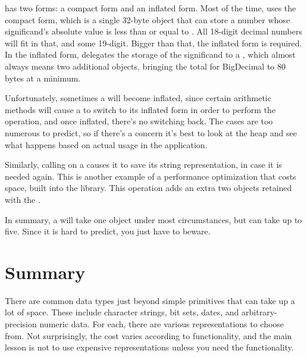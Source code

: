  has two forms: a compact form and an
inflated form. Most of the time,  uses the compact form,
which is a single 32-byte object that can store a number whose significand's
absolute value is less than or equal to .
All 18-digit decimal numbers will fit in that, and some 19-digit.  Bigger than
that, the inflated form is required. In the inflated form, 
delegates the storage of the significand to a , which almost always means two additional
objects, bringing the total for BigDecimal to 80 bytes at a
minimum.  

Unfortunately, sometimes a  will become inflated,
since certain arithmetic methods will cause a  to switch to its inflated form in order to perform the operation, and once inflated,
there's no switching back.  The cases are too numerous to predict, so if there's
a concern it's best to look at the heap and see what happens based on actual usage in the 
application.

Similarly, calling  on a  causes it to
save its string representation, in case it is needed again.
This is another example of a performance optimization that 
costs space, built into the library.  This operation adds an extra two objects
retained with the . 

In summary, a  will take one
object under most circumstances, but can take up to five. Since it is hard to
predict, you just have to beware.

\section{Summary} 

There are common data types just beyond simple primitives that can
take up a lot of space.  These include character strings, bit sets, dates, and
arbitrary-precision numeric data. For each, there are various
representations to choose from. Not surprisingly, the cost varies according to
functionality, and the main lesson is not to use expensive representations
unless you need the functionality.

